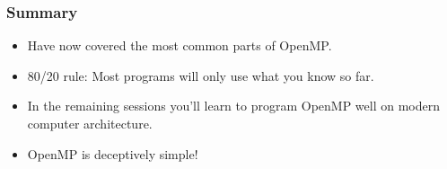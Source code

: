 \documentclass{beamer}
\begin{document}
\begin{frame}
\frametitle{Summary}
\begin{itemize}
  \item Have now covered the most common parts of OpenMP.
  \item 80/20 rule: Most programs will only use what you know so far.
  \item In the remaining sessions you'll learn to program OpenMP well on modern computer architecture.
  \item OpenMP is deceptively simple!
\end{itemize}
\end{frame}

\end{document}
